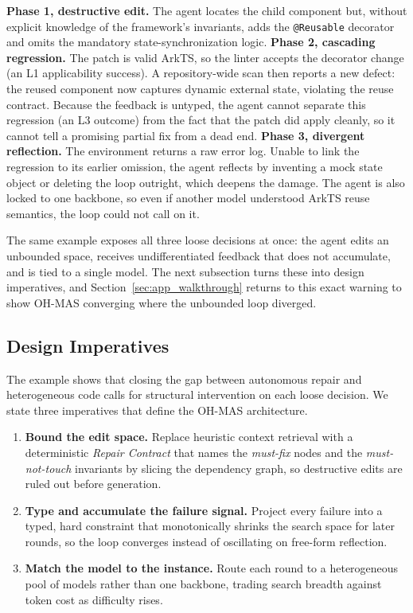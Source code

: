 \documentclass[10pt,conference]{IEEEtran}
\begin{document}
\textbf{Phase 1, destructive edit.} The agent locates the child component but, without explicit knowledge of the framework's invariants, adds the \texttt{@Reusable} decorator and omits the mandatory state-synchronization logic.
\textbf{Phase 2, cascading regression.} The patch is valid ArkTS, so the linter accepts the decorator change (an L1 applicability success). A repository-wide scan then reports a new defect: the reused component now captures dynamic external state, violating the reuse contract. Because the feedback is untyped, the agent cannot separate this regression (an L3 outcome) from the fact that the patch did apply cleanly, so it cannot tell a promising partial fix from a dead end.
\textbf{Phase 3, divergent reflection.} The environment returns a raw error log. Unable to link the regression to its earlier omission, the agent reflects by inventing a mock state object or deleting the loop outright, which deepens the damage. The agent is also locked to one backbone, so even if another model understood ArkTS reuse semantics, the loop could not call on it.

The same example exposes all three loose decisions at once: the agent edits an unbounded space, receives undifferentiated feedback that does not accumulate, and is tied to a single model. The next subsection turns these into design imperatives, and Section~\ref{sec:app_walkthrough} returns to this exact warning to show OH-MAS converging where the unbounded loop diverged.

\subsection{Design Imperatives}
\label{sec:bg_imperatives}

The example shows that closing the gap between autonomous repair and heterogeneous code calls for structural intervention on each loose decision. We state three imperatives that define the OH-MAS architecture.

\begin{enumerate}[label=\textbf{I\arabic*.}, leftmargin=*, topsep=2pt, itemsep=4pt]
    \item \textbf{Bound the edit space.} Replace heuristic context retrieval with a deterministic \emph{Repair Contract} that names the \emph{must-fix} nodes and the \emph{must-not-touch} invariants by slicing the dependency graph, so destructive edits are ruled out before generation.
    \item \textbf{Type and accumulate the failure signal.} Project every failure into a typed, hard constraint that monotonically shrinks the search space for later rounds, so the loop converges instead of oscillating on free-form reflection.
    \item \textbf{Match the model to the instance.} Route each round to a heterogeneous pool of models rather than one backbone, trading search breadth against token cost as difficulty rises.
\end{enumerate}
\end{document}

